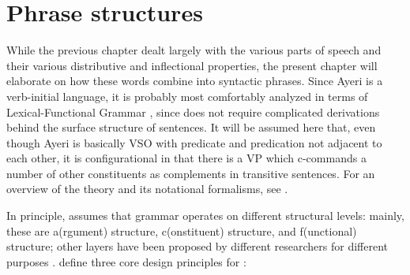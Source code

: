 
\chapter{Phrase structures}

While the previous chapter dealt largely with the various parts of speech and 
their various distributive and inflectional properties, the present chapter 
will elaborate on how these words combine into syntactic phrases. Since Ayeri 
is a verb-initial language, it is probably most comfortably analyzed in terms 
of Lexical-Functional Grammar \citep{bresnan2016}, since \lfg{} does not 
require complicated derivations behind the surface structure of sentences. It 
will be assumed here that, even though Ayeri is basically VSO with predicate 
and predication not adjacent to each other, it is configurational in that there 
is a VP which c-commands a number of other constituents as complements in 
transitive sentences. For an overview of the theory and its 
notational formalisms, see \citet{buttking2015}.

In principle, \lfg{} assumes that grammar operates on different structural 
levels: mainly, these are a(rgument) structure, c(onstituent) structure, and 
f(unctional) structure; other layers have been proposed by different 
researchers for different purposes \citep[862--865]{buttking2015}. 
\citet{bresnan2016} define three core design principles for \lfg{}:

